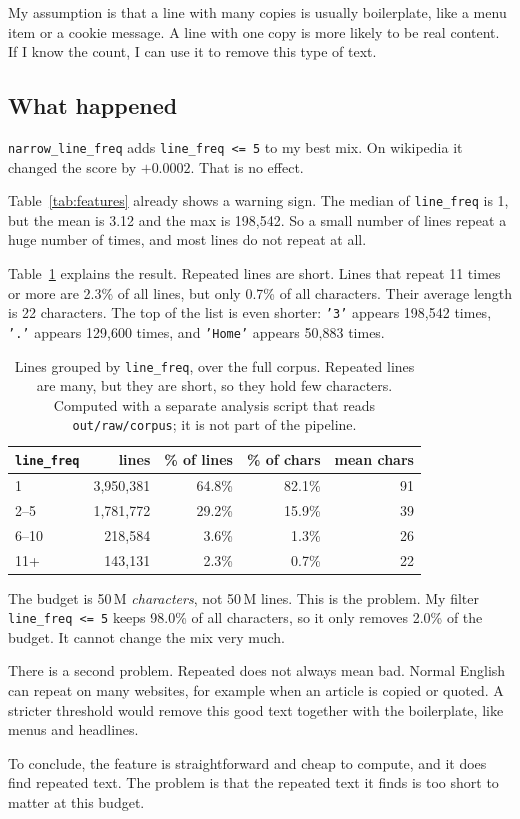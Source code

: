 \documentclass[10pt]{article}
\begin{document}
My assumption is that a line with many copies is usually boilerplate,
like a menu item or a cookie message. A line with one copy is more
likely to be real content. If I know the count, I can use it to remove
this type of text.


\subsection*{What happened}

\texttt{narrow\_line\_freq} adds \texttt{line\_freq <= 5} to my best
mix. On wikipedia it changed the score by $+0.0002$. That is no effect.

Table~\ref{tab:features} already shows a warning sign. The median of
\texttt{line\_freq} is 1, but the mean is 3.12 and the max is 198{,}542.
So a small number of lines repeat a huge number of times, and most lines
do not repeat at all.

Table~\ref{tab:freq} explains the result. Repeated lines are short. Lines
that repeat 11 times or more are 2.3\% of all lines, but only 0.7\% of
all characters. Their average length is 22 characters. The top of the
list is even shorter: \texttt{'3'} appears 198{,}542 times,
\texttt{'.'} appears 129{,}600 times, and \texttt{'Home'} appears
50{,}883 times.

\begin{table}[htbp]
\caption{Lines grouped by \texttt{line\_freq}, over the full corpus.
Repeated lines are many, but they are short, so they hold few
characters. Computed with a separate analysis script that reads
\texttt{out/raw/corpus}; it is not part of the pipeline.}
\label{tab:freq}
\centering
\begin{tabular}{lrrrr}
\toprule
\texttt{line\_freq} & lines & \% of lines & \% of chars & mean chars \\
\midrule
1     & 3{,}950{,}381 & 64.8\% & 82.1\% & 91 \\
2--5  & 1{,}781{,}772 & 29.2\% & 15.9\% & 39 \\
6--10 & 218{,}584     & 3.6\%  & 1.3\%  & 26 \\
11+   & 143{,}131     & 2.3\%  & 0.7\%  & 22 \\
\bottomrule
\end{tabular}
\end{table}

The budget is 50\,M \emph{characters}, not 50\,M lines. This is the
problem. My filter \texttt{line\_freq <= 5} keeps 98.0\% of all
characters, so it only removes 2.0\% of the budget. It cannot change the
mix very much.

There is a second problem. Repeated does not always mean bad. Normal
English can repeat on many websites, for example when an article is
copied or quoted. A stricter threshold would remove this good text
together with the boilerplate, like menus and headlines.

To conclude, the feature is straightforward and cheap to compute, and it
does find repeated text. The problem is that the repeated text it finds
is too short to matter at this budget.
\end{document}
